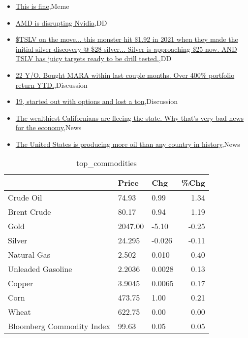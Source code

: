 \documentclass{article}%
\begin{document}
%
\begin{itemize}%
\item%
\href{https://reddit.com/r/wallstreetbets/comments/18mrv04/this\_is\_fine/}{This is fine},Meme%
\item%
\href{https://reddit.com/r/wallstreetbets/comments/18mqopg/amd\_is\_disrupting\_nvidia/}{AMD is disrupting Nvidia},DD%
\item%
\href{https://reddit.com/r/Baystreetbets/comments/18mci1t/tslv\_on\_the\_move\_this\_monster\_hit\_192\_in\_2021/}{\$TSLV on the move... this monster hit \$1.92 in 2021 when they made the initial silver discovery @ \$28 silver... Silver is approaching \$25 now. AND TSLV has juicy targets ready to be drill tested.},DD%
\item%
\href{https://reddit.com/r/StockMarket/comments/18miz9t/22\_yo\_bought\_mara\_within\_last\_couple\_months\_over/}{22 Y/O. Bought MARA within last couple months. Over 400\% portfolio return YTD.},Discussion%
\item%
\href{https://reddit.com/r/StockMarket/comments/18md7xc/19\_started\_out\_with\_options\_and\_lost\_a\_ton/}{19, started out with options and lost a ton},Discussion%
\item%
\href{https://reddit.com/r/Economics/comments/18ms23s/the\_wealthiest\_californians\_are\_fleeing\_the\_state/}{The wealthiest Californians are fleeing the state. Why that's very bad news for the economy},News%
\item%
\href{https://reddit.com/r/Economics/comments/18mlgnr/the\_united\_states\_is\_producing\_more\_oil\_than\_any/}{The United States is producing more oil than any country in history},News%
\end{itemize}%


\begin{table}[htbp]%
\caption{top\_commodities}%
\centering%
\begin{adjustbox}{width=1\textwidth}%
\begin{tabular}{lllr}
\toprule
                          &   Price &    Chg &  \%Chg \\
\midrule
               Crude Oil  &   74.93 &   0.99 &  1.34 \\
             Brent Crude  &   80.17 &   0.94 &  1.19 \\
                    Gold  & 2047.00 &  -5.10 & -0.25 \\
                  Silver  &  24.295 & -0.026 & -0.11 \\
             Natural Gas  &   2.502 &  0.010 &  0.40 \\
       Unleaded Gasoline  &  2.2036 & 0.0028 &  0.13 \\
                  Copper  &  3.9045 & 0.0065 &  0.17 \\
                    Corn  &  473.75 &   1.00 &  0.21 \\
                   Wheat  &  622.75 &   0.00 &  0.00 \\
Bloomberg Commodity Index &   99.63 &   0.05 &  0.05 \\
\bottomrule
\end{tabular}
%
\end{adjustbox}%
\end{table}
\end{document}
